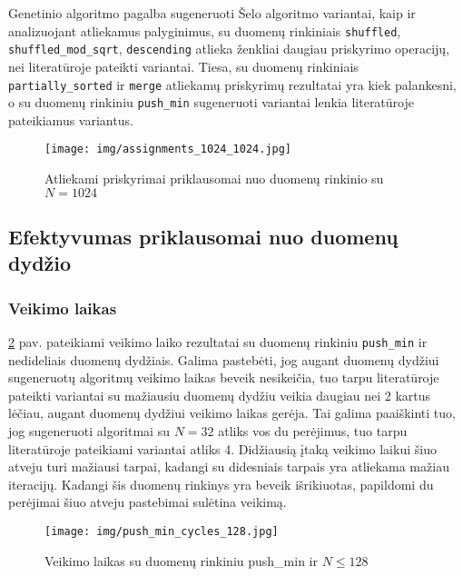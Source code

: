 \documentclass{VUMIFInfBakalaurinis}
\begin{document}
Genetinio algoritmo pagalba sugeneruoti Šelo algoritmo variantai, kaip ir analizuojant atliekamus palyginimus,
su duomenų rinkiniais \verb|shuffled|, \verb|shuffled_mod_sqrt|, \verb|descending| atlieka ženkliai daugiau priskyrimo operacijų, nei literatūroje pateikti variantai.
Tiesa, su duomenų rinkiniais \verb|partially_sorted| ir \verb|merge| atliekamų priskyrimų rezultatai yra kiek palankesni,
o su duomenų rinkiniu \verb|push_min|
sugeneruoti variantai lenkia literatūroje pateikiamus variantus.


\begin{figure}[H]
  \centering
  \texttt{[image: img/assignments\_1024\_1024.jpg]}
  \caption{Atliekami priskyrimai priklausomai nuo duomenų rinkinio su $N = 1024$}
  \label{img:assignments_1024_1024}
\end{figure}

\pagebreak

\subsection{Efektyvumas priklausomai nuo duomenų dydžio}

\subsubsection{Veikimo laikas}

\ref{img:push_min_cycles_128} pav. pateikiami veikimo laiko rezultatai su duomenų rinkiniu \verb|push_min| ir nedideliais duomenų dydžiais.
Galima pastebėti, jog augant duomenų dydžiui sugeneruotų algoritmų veikimo laikas beveik nesikeičia, tuo tarpu literatūroje pateikti variantai
su mažiausiu duomenų dydžiu veikia daugiau nei 2 kartus lėčiau, augant duomenų dydžiui veikimo laikas gerėja.
Tai galima paaiškinti tuo, jog sugeneruoti algoritmai su $N = 32$ atliks vos du perėjimus, tuo tarpu literatūroje pateikiami variantai atliks 4.
Didžiausią įtaką veikimo laikui šiuo atveju turi mažiausi tarpai, kadangi su didesniais tarpais yra atliekama mažiau iteracijų.
Kadangi šis duomenų rinkinys yra beveik išrikiuotas, papildomi du perėjimai šiuo atveju pastebimai sulėtina veikimą.

\begin{figure}[H]
  \centering
  \texttt{[image: img/push\_min\_cycles\_128.jpg]}
  \caption{Veikimo laikas su duomenų rinkiniu push\_min ir $N \leq 128$}
  \label{img:push_min_cycles_128}
\end{figure}
\end{document}
